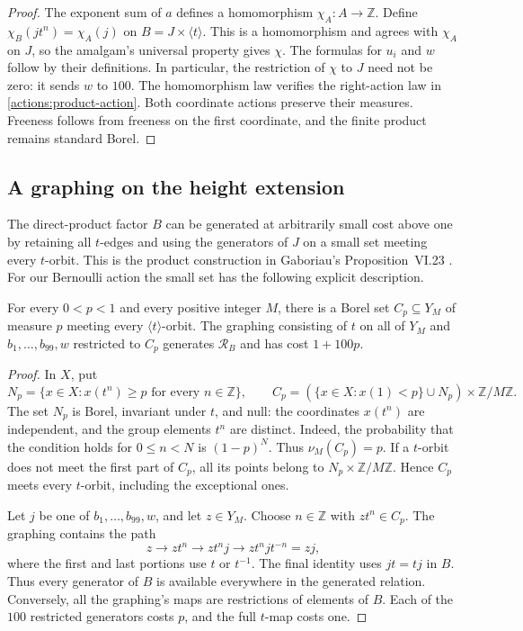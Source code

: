 \begin{proof}
The exponent sum of $a$ defines a homomorphism $\chi_A:A\to\mathbb Z$.
Define $\chi_B(jt^n)=\chi_A(j)$ on $B=J\times\langle t\rangle$.
This is a homomorphism and agrees with $\chi_A$ on $J$, so the
amalgam's universal property gives $\chi$.  The formulas for $u_i$
and $w$ follow by their definitions.  In particular, the restriction
of $\chi$ to $J$ need not be zero: it sends $w$ to $100$.
The homomorphism law verifies the right-action law in
\eqref{actions:product-action}.  Both coordinate actions preserve
their measures.  Freeness follows from freeness on the first
coordinate, and the finite product remains standard Borel.
\end{proof}

\subsection{A graphing on the height extension}

The direct-product factor $B$ can be generated at arbitrarily small
cost above one by retaining all $t$-edges and using the generators of
$J$ on a small set meeting every $t$-orbit.  This is the product
construction in Gaboriau's Proposition~VI.23
\cite[Proposition~VI.23]{gaboriau-2000}.  For our Bernoulli action the
small set has the following explicit description.

\begin{lemma}
\label{actions:small-marker}
For every $0<p<1$ and every positive integer $M$, there is a Borel
set $C_p\subseteq Y_M$ of measure $p$ meeting every
$\langle t\rangle$-orbit.  The graphing consisting of $t$ on all
of $Y_M$ and $b_1,\ldots,b_{99},w$ restricted to $C_p$ generates
$\mathcal R_B$ and has cost $1+100p$.
\end{lemma}

\begin{proof}
In $X$, put
\[
 N_p=\{x\in X:x(t^n)\geq p\text{ for every }n\in\mathbb Z\},
 \qquad
 C_p=(\{x\in X:x(1)<p\}\cup N_p)\times\mathbb Z/M\mathbb Z.
\]
The set $N_p$ is Borel, invariant under $t$, and null: the coordinates
$x(t^n)$ are independent, and the group elements $t^n$ are distinct.
Indeed, the probability that the condition holds for $0\leq n<N$
is $(1-p)^N$.  Thus $\nu_M(C_p)=p$.
If a $t$-orbit does not meet the first part of $C_p$, all its points
belong to $N_p\times\mathbb Z/M\mathbb Z$.  Hence $C_p$ meets every
$t$-orbit, including the exceptional ones.

Let $j$ be one of $b_1,\ldots,b_{99},w$, and let $z\in Y_M$.
Choose $n\in\mathbb Z$ with $zt^n\in C_p$.  The graphing contains
the path
\[
 z\longrightarrow zt^n\longrightarrow zt^nj
   \longrightarrow zt^njt^{-n}=zj,
\]
where the first and last portions use $t$ or $t^{-1}$.  The final
identity uses $jt=tj$ in $B$.  Thus every generator of $B$ is
available everywhere in the generated relation.  Conversely, all
the graphing's maps are restrictions of elements of $B$.
Each of the $100$ restricted generators costs $p$, and the full
$t$-map costs one.
\end{proof}

